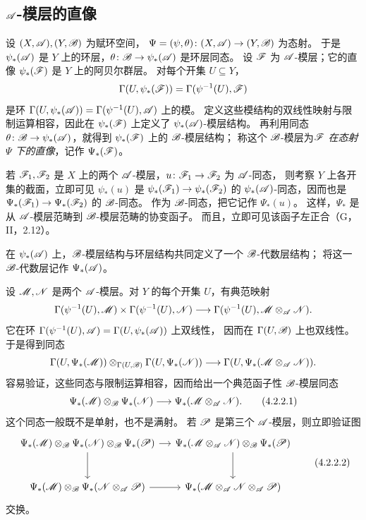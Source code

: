 \subsection{\texorpdfstring{$\mathscr A$}{A}-模层的直像}\hypertarget{heading:0:4.2}{}

设 $(X,\mathscr A),(Y,\mathscr B)$ 为赋环空间，
$\Psi=(\psi,\theta)\colon(X,\mathscr A)\to(Y,\mathscr B)$ 为态射。
于是 $\psi_*(\mathscr A)$ 是 $Y$ 上的环层，$\theta\colon\mathscr B\to\psi_*(\mathscr A)$ 是环层同态。
设 $\mathscr F$ 为 $\mathscr A$-模层；它的直像 $\psi_*(\mathscr F)$ 是 $Y$ 上的阿贝尔群层。
对每个开集 $U\subseteq Y$，
\[
 \Gamma(U,\psi_*(\mathscr F))=\Gamma(\psi^{-1}(U),\mathscr F)
\]
是环 $\Gamma(U,\psi_*(\mathscr A))=\Gamma(\psi^{-1}(U),\mathscr A)$ 上的模。
定义这些模结构的双线性映射与限制运算相容，因此在 $\psi_*(\mathscr F)$ 上定义了
$\psi_*(\mathscr A)$-模层结构。
再利用同态 $\theta\colon\mathscr B\to\psi_*(\mathscr A)$，就得到 $\psi_*(\mathscr F)$ 上的 $\mathscr B$-模层结构；
称这个 $\mathscr B$-模层为\emph{$\mathscr F$ 在态射 $\Psi$ 下的直像}，记作 $\Psi_*(\mathscr F)$。

若 $\mathscr F_1,\mathscr F_2$ 是 $X$ 上的两个 $\mathscr A$-模层，$u\colon\mathscr F_1\to\mathscr F_2$ 为 $\mathscr A$-同态，
则考察 $Y$ 上各开集的截面，立即可见 $\psi_*(u)$ 是
$\psi_*(\mathscr F_1)\to\psi_*(\mathscr F_2)$ 的 $\psi_*(\mathscr A)$-同态，因而也是
$\Psi_*(\mathscr F_1)\to\Psi_*(\mathscr F_2)$ 的 $\mathscr B$-同态。
作为 $\mathscr B$-同态，把它记作 $\Psi_*(u)$。
这样，$\Psi_*$ 是从 $\mathscr A$-模层范畴到 $\mathscr B$-模层范畴的协变函子。
而且，立即可见该函子左正合（G，II，2.12）。

在 $\psi_*(\mathscr A)$ 上，$\mathscr B$-模层结构与环层结构共同定义了一个 $\mathscr B$-代数层结构；
将这一 $\mathscr B$-代数层记作 $\Psi_*(\mathscr A)$。

设 $\mathscr M,\mathscr N$ 是两个 $\mathscr A$-模层。对 $Y$ 的每个开集 $U$，有典范映射
\[
 \Gamma(\psi^{-1}(U),\mathscr M)\times\Gamma(\psi^{-1}(U),\mathscr N)
 \longrightarrow\Gamma(\psi^{-1}(U),\mathscr M\otimes_{\mathscr A}\mathscr N).
\]
它在环 $\Gamma(\psi^{-1}(U),\mathscr A)=\Gamma(U,\psi_*(\mathscr A))$ 上双线性，
因而在 $\Gamma(U,\mathscr B)$ 上也双线性。于是得到同态
\[
 \Gamma(U,\Psi_*(\mathscr M))\otimes_{\Gamma(U,\mathscr B)}\Gamma(U,\Psi_*(\mathscr N))
 \longrightarrow\Gamma(U,\Psi_*(\mathscr M\otimes_{\mathscr A}\mathscr N)).
\]
容易验证，这些同态与限制运算相容，因而给出一个典范函子性 $\mathscr B$-模层同态
\begin{equation}
 \Psi_*(\mathscr M)\otimes_{\mathscr B}\Psi_*(\mathscr N)
 \longrightarrow\Psi_*(\mathscr M\otimes_{\mathscr A}\mathscr N).
 \tag{4.2.2.1}\label{eq:0:4.2.2.1}
\end{equation}
这个同态一般既不是单射，也不是满射。
若 $\mathscr P$ 是第三个 $\mathscr A$-模层，则立即验证图
\begin{equation}
\begin{tikzcd}[column sep=small,row sep=large]
\Psi_*(\M)\otimes_{\BB}\Psi_*(\N)\otimes_{\BB}\Psi_*(\PP)
 \arrow[r]\arrow[d] &
\Psi_*(\M\otimes_{\A}\N)\otimes_{\BB}\Psi_*(\PP)\arrow[d]\\
\Psi_*(\M)\otimes_{\BB}\Psi_*(\N\otimes_{\A}\PP)\arrow[r]&
\Psi_*(\M\otimes_{\A}\N\otimes_{\A}\PP)
\end{tikzcd}
\tag{4.2.2.2}\label{eq:0:4.2.2.2}
\end{equation}
交换。

